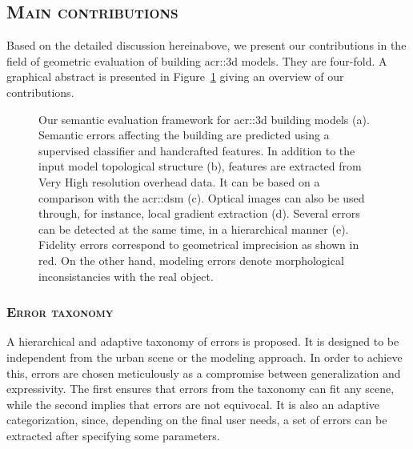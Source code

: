     \subsection{\textsc{Main contributions}}
        \label{sec::introduction::contributions::contributions}
        Based on the detailed discussion hereinabove, we present our contributions in the field of geometric evaluation of building \gls{acr::3d} models.
        They are four-fold.
        A graphical abstract is presented in Figure~\ref{fig::graphical_abstract} giving an overview of our contributions.
        \begin{figure}[htpb]
            \centering
                        
            \caption[
                Our semantic evaluation framework for \acrshort*{acr::3d} building models.
            ]{
                \label{fig::graphical_abstract} Our semantic evaluation framework for \gls{acr::3d} building models (a).
                Semantic errors affecting the building are predicted using a supervised classifier and handcrafted features.
                In addition to the input model topological structure (b), features are extracted from Very High resolution overhead data.
                It can be based on a comparison with the \gls*{acr::dsm} (c).
                Optical images can also be used through, for instance, local gradient extraction (d).
                Several errors can be detected at the same time, in a hierarchical manner (e).
                Fidelity errors correspond to geometrical imprecision as shown in red.
                On the other hand, modeling errors denote morphological inconsistancies with the real object.
            }
        \end{figure}
        \subsubsection{\textsc{Error taxonomy}}
            A hierarchical and adaptive taxonomy of errors is proposed.
            It is designed to be independent from the urban scene or the modeling approach.
            In order to achieve this, errors are chosen meticulously as a compromise between generalization and expressivity.
            The first ensures that errors from the taxonomy can fit any scene, while the second implies that errors are not equivocal.
            It is also an adaptive categorization, since, depending on the final user needs, a set of errors can be extracted after specifying some parameters.
            
